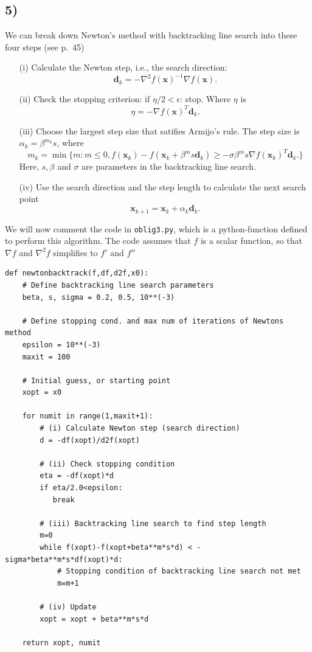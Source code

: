 \documentclass[a4paper, 11pt, notitlepage, english]{article}
\newcommand{\eps}{\epsilon}
\newcommand{\bt}[1]{\boldsymbol{#1}}
\begin{document}
\subsection*{5)}
We can break down Newton's method with backtracking line search into these four steps (see p.\ 45)
\begin{itemize}
    \item[(i)] Calculate the Newton step, i.e., the search direction:
    $$\bt{d}_k = -\nabla ^2 f(\bt{x})^{-1}\nabla f(\bt{x}).$$
    \item[(ii)] Check the stopping criterion: if $\eta /2 < \eps$: stop. Where $\eta$ is
    $$\eta = -\nabla f(\bt{x})^T \bt{d}_k.$$
    \item[(iii)] Choose the largest step size that satifies Armijo's rule. The step size is $\alpha_k = \beta^{m_k} s$, where 
    $$m_k = \min\{m: m\leq 0, f(\bt{x}_k) - f(\bt{x}_k + \beta^m s \bt{d}_k) \geq -\sigma \beta^m s \nabla f(\bt{x}_k)^T \bt{d}_k.\}$$
    Here, $s,\beta$ and $\sigma$ are parameters in the backtracking line search.
    \item[(iv)] Use the search direction and the step length to calculate the next search point
    $$\bt{x}_{k+1} = \bt{x}_k + \alpha_k\bt{d}_k.$$
\end{itemize}

We will now comment the code in \verb+oblig3.py+, which is a python-function defined to perform this algorithm. The code assumes that $f$ is a scalar function, so that $\nabla f$ and $\nabla^2 f$ simplifies to $f'$ and $f''$

\begin{lstlisting}
def newtonbacktrack(f,df,d2f,x0):
    # Define backtracking line search parameters
    beta, s, sigma = 0.2, 0.5, 10**(-3)
    
    # Define stopping cond. and max num of iterations of Newtons method
    epsilon = 10**(-3)
    maxit = 100
    
    # Initial guess, or starting point    
    xopt = x0
    
    for numit in range(1,maxit+1):
        # (i) Calculate Newton step (search direction)
        d = -df(xopt)/d2f(xopt)

        # (ii) Check stopping condition
        eta = -df(xopt)*d
        if eta/2.0<epsilon:
           break

        # (iii) Backtracking line search to find step length   
        m=0 
        while f(xopt)-f(xopt+beta**m*s*d) < -sigma*beta**m*s*df(xopt)*d:
            # Stopping condition of backtracking line search not met 
            m=m+1

        # (iv) Update
        xopt = xopt + beta**m*s*d

    return xopt, numit 
\end{lstlisting}
\end{document}
